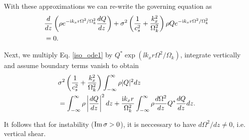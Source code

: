 With these approximations we can re-write the governing equation as
\begin{align}\label{iso_ode1}
&\frac{d}{dz}\left(\rho e^{-\mathrm{i} k_x r
    \Omega^2/\Omega_k^2}\frac{dQ}{dz}\right) +
\sigma^2\left(\frac{1}{c_s^2}+\frac{k_x^2}{\Omega_k^2}\right) \rho Q e^{-\mathrm{i} k_x r
  \Omega^2/\Omega_k^2} \notag\\
&=0.
\end{align}

Next, we multiply Eq. \ref{iso_ode1} by $Q^{*}\exp{\left(\ii k_x r
    \Omega^2/\Omega_k\right)}$, integrate 
vertically and assume boundary terms vanish to obtain
\begin{align}\label{neccessary_cond}
   &\sigma^2\left(\frac{1}{c_s^2}+\frac{k_x^2}{\Omega_k^2}\right)\int_{-\infty}^{\infty}\rho|Q|^2dz \notag\\
  &=\int_{-\infty}^{\infty}\rho\left|\frac{dQ}{dz}\right|^2dz 
  +\frac{\mathrm{i} k_x r}{\Omega_k^2}\int_{-\infty}^{\infty}\rho\frac{d\Omega^2}{dz}Q^*\frac{dQ}{dz}dz. 
\end{align}

It follows that for instability ($\operatorname{Im}\sigma>0$), it is neccessary to
have $d\Omega^2/dz\neq 0$, i.e. vertical 
shear. 

